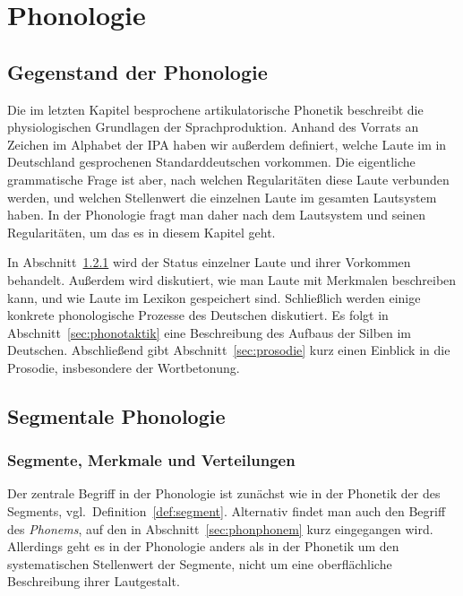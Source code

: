 \chapter{Phonologie}

\label{sec:phonologie}

\section{Gegenstand der Phonologie}

Die im letzten Kapitel besprochene artikulatorische Phonetik beschreibt die physiologischen Grundlagen der Sprachproduktion.
Anhand des Vorrats an Zeichen im Alphabet der IPA haben wir außerdem definiert, welche Laute im in Deutschland gesprochenen Standarddeutschen vorkommen.
Die eigentliche grammatische Frage ist aber, nach welchen Regularitäten diese Laute verbunden werden, und welchen Stellenwert die einzelnen Laute im gesamten Lautsystem haben.
In der Phonologie fragt man daher nach dem Lautsystem und seinen Regularitäten, um das es in diesem Kapitel geht.

In Abschnitt~\ref{sec:segmenteverteilungen} wird der Status einzelner Laute und ihrer Vorkommen behandelt.
Außerdem wird diskutiert, wie man Laute mit Merkmalen beschreiben kann, und wie Laute im Lexikon gespeichert sind.
Schließlich werden einige konkrete phonologische Prozesse des Deutschen diskutiert.
Es folgt in Abschnitt~\ref{sec:phonotaktik} eine Beschreibung des Aufbaus der Silben im Deutschen.
Abschließend gibt Abschnitt~\ref{sec:prosodie} kurz einen Einblick in die Prosodie, insbesondere der Wortbetonung.

\section{Segmentale Phonologie}

\subsection{Segmente, Merkmale und Verteilungen}

\label{sec:segmenteverteilungen}
\label{sec:verteilungen}

Der zentrale Begriff in der Phonologie ist zunächst wie in der Phonetik der des Segments, vgl.\ Definition~\ref{def:segment}.
Alternativ findet man auch den Begriff des \textit{Phonems}, auf den in Abschnitt~\ref{sec:phonphonem} kurz eingegangen wird.
Allerdings geht es in der Phonologie anders als in der Phonetik um den systematischen Stellenwert der Segmente, nicht um eine oberflächliche Beschreibung ihrer Lautgestalt.

